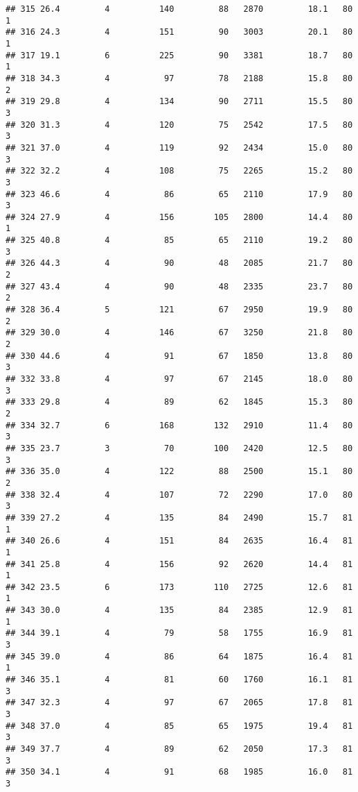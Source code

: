 \documentclass[
]{article}
\begin{document}
\begin{verbatim}
## 315 26.4         4          140         88   2870         18.1   80      1
## 316 24.3         4          151         90   3003         20.1   80      1
## 317 19.1         6          225         90   3381         18.7   80      1
## 318 34.3         4           97         78   2188         15.8   80      2
## 319 29.8         4          134         90   2711         15.5   80      3
## 320 31.3         4          120         75   2542         17.5   80      3
## 321 37.0         4          119         92   2434         15.0   80      3
## 322 32.2         4          108         75   2265         15.2   80      3
## 323 46.6         4           86         65   2110         17.9   80      3
## 324 27.9         4          156        105   2800         14.4   80      1
## 325 40.8         4           85         65   2110         19.2   80      3
## 326 44.3         4           90         48   2085         21.7   80      2
## 327 43.4         4           90         48   2335         23.7   80      2
## 328 36.4         5          121         67   2950         19.9   80      2
## 329 30.0         4          146         67   3250         21.8   80      2
## 330 44.6         4           91         67   1850         13.8   80      3
## 332 33.8         4           97         67   2145         18.0   80      3
## 333 29.8         4           89         62   1845         15.3   80      2
## 334 32.7         6          168        132   2910         11.4   80      3
## 335 23.7         3           70        100   2420         12.5   80      3
## 336 35.0         4          122         88   2500         15.1   80      2
## 338 32.4         4          107         72   2290         17.0   80      3
## 339 27.2         4          135         84   2490         15.7   81      1
## 340 26.6         4          151         84   2635         16.4   81      1
## 341 25.8         4          156         92   2620         14.4   81      1
## 342 23.5         6          173        110   2725         12.6   81      1
## 343 30.0         4          135         84   2385         12.9   81      1
## 344 39.1         4           79         58   1755         16.9   81      3
## 345 39.0         4           86         64   1875         16.4   81      1
## 346 35.1         4           81         60   1760         16.1   81      3
## 347 32.3         4           97         67   2065         17.8   81      3
## 348 37.0         4           85         65   1975         19.4   81      3
## 349 37.7         4           89         62   2050         17.3   81      3
## 350 34.1         4           91         68   1985         16.0   81      3

\end{verbatim}
\end{document}
